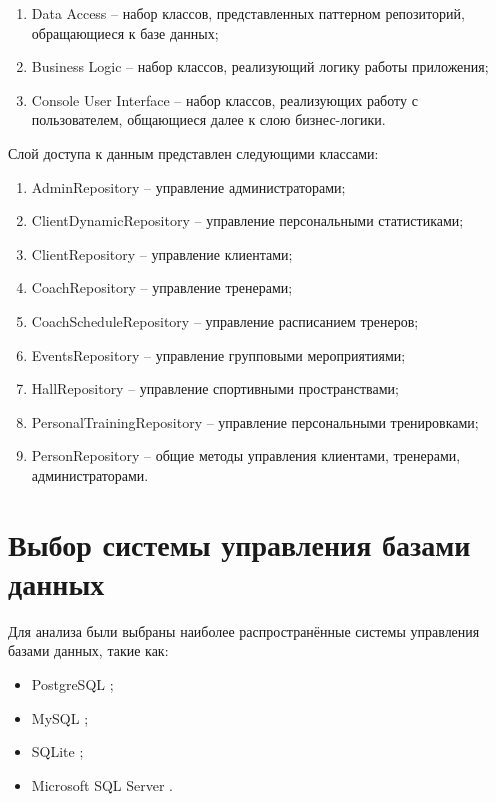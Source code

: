 \begin{enumerate}
    \item Data Access -- набор классов, представленных паттерном репозиторий, обращающиеся к базе данных;
    \item Business Logic -- набор классов, реализующий логику работы приложения;
    \item Console User Interface -- набор классов, реализующих работу с пользователем, общающиеся далее к слою бизнес-логики.
\end{enumerate}

Слой доступа к данным представлен следующими классами:

\begin{enumerate}
    \item AdminRepository -- управление администраторами;
    \item ClientDynamicRepository -- управление персональными статистиками;
    \item ClientRepository -- управление клиентами;
    \item CoachRepository -- управление тренерами;
    \item CoachScheduleRepository -- управление расписанием тренеров;
    \item EventsRepository -- управление групповыми мероприятиями;
    \item HallRepository -- управление спортивными пространствами;
    \item PersonalTrainingRepository -- управление персональными тренировками;
    \item PersonRepository -- общие методы управления клиентами, тренерами, администраторами.
\end{enumerate}


\section{Выбор системы управления базами данных}

Для анализа были выбраны наиболее распространённые системы управления базами данных, такие как:

\begin{itemize}[label=—]
	\item PostgreSQL \cite{PostgreSQL};
	\item MySQL \cite{MySQL};
	\item SQLite \cite{SQLite};
	\item Microsoft SQL Server \cite{MSSQL}.
\end{itemize}

